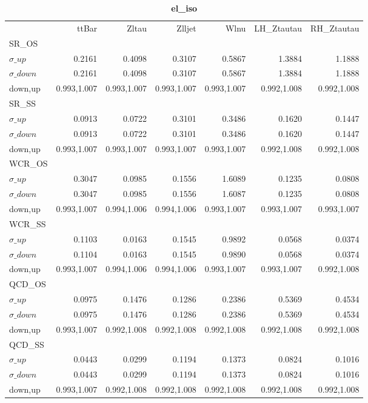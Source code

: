 \documentclass[11pt,oneside,a4paper]{article}
\begin{document}
\begin{table}
\centering
\caption{\bf{el\_iso}}
\begin{tabular}{lrrrrrr}
 & ttBar & Zltau & Zlljet & Wlnu & LH\_Ztautau & RH\_Ztautau \\
SR\_OS &  &  &  &  &  &  \\
$\sigma\_up$ & 0.2161 & 0.4098 & 0.3107 & 0.5867 & 1.3884 & 1.1888 \\
$\sigma\_down$ & 0.2161 & 0.4098 & 0.3107 & 0.5867 & 1.3884 & 1.1888 \\
down,up & 0.993,1.007 & 0.993,1.007 & 0.993,1.007 & 0.993,1.007 & 0.992,1.008 & 0.992,1.008 \\

\hline
SR\_SS &  &  &  &  &  &  \\
$\sigma\_up$ & 0.0913 & 0.0722 & 0.3101 & 0.3486 & 0.1620 & 0.1447 \\
$\sigma\_down$ & 0.0913 & 0.0722 & 0.3101 & 0.3486 & 0.1620 & 0.1447 \\
down,up & 0.993,1.007 & 0.993,1.007 & 0.993,1.007 & 0.993,1.007 & 0.992,1.008 & 0.992,1.008 \\

\hline
WCR\_OS &  &  &  &  &  &  \\
$\sigma\_up$ & 0.3047 & 0.0985 & 0.1556 & 1.6089 & 0.1235 & 0.0808 \\
$\sigma\_down$ & 0.3047 & 0.0985 & 0.1556 & 1.6087 & 0.1235 & 0.0808 \\
down,up & 0.993,1.007 & 0.994,1.006 & 0.994,1.006 & 0.993,1.007 & 0.993,1.007 & 0.993,1.007 \\

\hline
WCR\_SS &  &  &  &  &  &  \\
$\sigma\_up$ & 0.1103 & 0.0163 & 0.1545 & 0.9892 & 0.0568 & 0.0374 \\
$\sigma\_down$ & 0.1104 & 0.0163 & 0.1545 & 0.9890 & 0.0568 & 0.0374 \\
down,up & 0.993,1.007 & 0.994,1.006 & 0.994,1.006 & 0.993,1.007 & 0.993,1.007 & 0.992,1.008 \\

\hline
QCD\_OS &  &  &  &  &  &  \\
$\sigma\_up$ & 0.0975 & 0.1476 & 0.1286 & 0.2386 & 0.5369 & 0.4534 \\
$\sigma\_down$ & 0.0975 & 0.1476 & 0.1286 & 0.2386 & 0.5369 & 0.4534 \\
down,up & 0.993,1.007 & 0.992,1.008 & 0.992,1.008 & 0.992,1.008 & 0.992,1.008 & 0.992,1.008 \\

\hline
QCD\_SS &  &  &  &  &  &  \\
$\sigma\_up$ & 0.0443 & 0.0299 & 0.1194 & 0.1373 & 0.0824 & 0.1016 \\
$\sigma\_down$ & 0.0443 & 0.0299 & 0.1194 & 0.1373 & 0.0824 & 0.1016 \\
down,up & 0.993,1.007 & 0.992,1.008 & 0.992,1.008 & 0.992,1.008 & 0.992,1.008 & 0.992,1.008 \\

\hline
\end{tabular}
\end{table}
\end{document}
